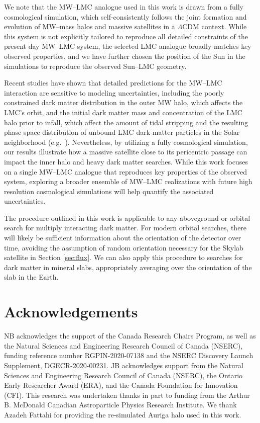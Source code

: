 \documentclass[12pt]{article}
\begin{document}
We note that the MW–LMC analogue used in this work is drawn from a fully cosmological simulation, which self-consistently follows the joint formation and evolution of MW–mass halos and massive satellites in a $\Lambda$CDM context. While this system is not explicitly tailored to reproduce all detailed constraints of the present day MW–LMC system, the selected LMC analogue broadly matches key observed properties, and we have further chosen the position of the Sun in the simulations to reproduce the observed Sun–LMC geometry. 

Recent studies have shown that detailed predictions for the MW–LMC interaction are sensitive to modeling uncertainties, including the poorly constrained dark matter distribution in the outer MW halo, which affects the LMC's orbit, and the initial dark matter mass and concentration of the LMC halo prior to infall, which affect the amount of tidal stripping and the resulting phase space distribution of unbound LMC dark matter particles in the Solar neighborhood (e.g.~\cite{2024MNRAS.531.3524Y, 2025MNRAS.544.1820Y, 2022MNRAS.514.1266P}). Nevertheless, by utilizing a fully cosmological simulation, our results illustrate how a massive satellite close to its pericentric passage can impact the inner halo and heavy dark matter searches. While this work focuses on a single MW–LMC analogue that reproduces key properties of the observed system, exploring a broader ensemble of MW–LMC realizations with future high resolution cosmological simulations will help quantify the associated uncertainties.

The procedure outlined in this work is applicable to any aboveground or orbital search for multiply interacting dark matter. For modern orbital searches, there will likely be sufficient information about the orientation of the detector over time, avoiding the assumption of random orientation necessary for the Skylab satellite in Section \ref{sec:flux}. We can also apply this procedure to searches for dark matter in mineral slabs, appropriately averaging over the orientation of the slab in the Earth.

\section*{Acknowledgements}

NB acknowledges the support of the Canada Research Chairs Program, as well as the Natural Sciences and Engineering Research Council of Canada (NSERC), funding reference number RGPIN-2020-07138 and the NSERC Discovery Launch Supplement, DGECR-2020-00231. JB acknowledges support from the Natural Sciences and Engineering Research Council of Canada (NSERC), the Ontario Early Researcher Award (ERA), and the Canada Foundation for Innovation (CFI). This research was undertaken thanks in part to funding from the Arthur B. McDonald Canadian Astroparticle Physics Research Institute. We thank Azadeh Fattahi for providing the re-simulated Auriga halo used in this work.





\end{document}
